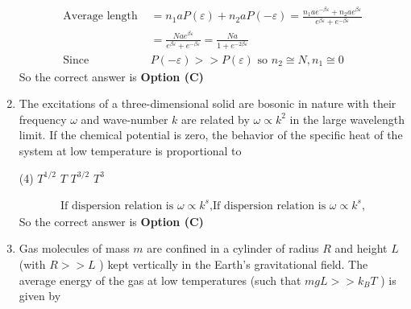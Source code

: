 \begin{enumerate}
\begin{answer}
\begin{align*}
\text{Average length }&=n_{1} a P(\varepsilon)+n_{2} a P(-\varepsilon)=\frac{n_{1} a e^{-\beta \varepsilon}+n_{2} a e^{\beta \varepsilon}}{e^{\beta \varepsilon}+e^{-\beta \varepsilon}}\\&=\frac{N a e^{\beta \varepsilon}}{e^{\beta \varepsilon}+e^{-\beta \varepsilon}}=\frac{N a}{1+e^{-2 \beta \varepsilon}}\\
\text{Since }&P(-\varepsilon)>>P(\varepsilon)\text{ so }n_{2} \cong N, n_{1} \cong 0
\end{align*}
So the correct answer is \textbf{Option (C)}
\end{answer}
\item The excitations of a three-dimensional solid are bosonic in nature with their frequency $\omega$ and wave-number $k$ are related by $\omega \propto k^{2}$ in the large wavelength limit. If the chemical potential is zero, the behavior of the specific heat of the system at low temperature is proportional to
{}
\begin{tasks}(4)
\task[\textbf{A.}] $T^{1 / 2}$
\task[\textbf{B.}] $T$
\task[\textbf{C.}]  $T^{3 / 2}$
\task[\textbf{D.}] $T^{3}$
\end{tasks}
\begin{answer}
\begin{align*}
\text{If dispersion relation is $\omega \propto k^{s}$,}
\text{If dispersion relation is $\omega \propto k^{s}$,}
\end{align*}
So the correct answer is \textbf{Option (C)}
\end{answer}
\item Gas molecules of mass $m$ are confined in a cylinder of radius $R$ and height $L$ (with $R>>L$ ) kept vertically in the Earth's gravitational field. The average energy of the gas at low temperatures (such that $m g L>>k_{B} T$ ) is given by
{}


\end{enumerate}
